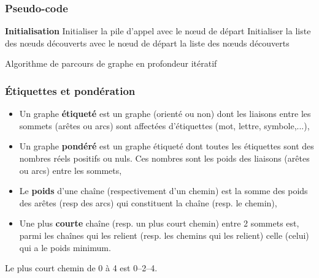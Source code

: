 \begin{frame}[fragile]
\frametitle{Pseudo-code}
\begin{algorithm}[H]
\SetAlgoLined
\textbf{Initialisation}\;
Initialiser la pile d'appel avec le n\oe{}ud de départ\;
Initialiser la liste des n\oe{}uds découverts avec le n\oe{}ud de départ\;
\Return la liste des n\oe{}uds découverts
\caption{Algorithme de parcours de graphe en profondeur itératif}
\end{algorithm}
\end{frame}

\begin{frame}[fragile]
\frametitle{Étiquettes et pondération}
\begin{itemize}
\item Un graphe \textbf{étiqueté} est un graphe (orienté ou non) dont les liaisons entre les sommets (arêtes ou arcs) sont affectées d’étiquettes (mot, lettre, symbole,...),
\item Un graphe \textbf{pondéré} est un graphe étiqueté dont toutes les étiquettes sont des nombres réels positifs ou nuls. Ces nombres sont les poids des liaisons (arêtes ou arcs) entre les sommets,
\item Le \textbf{poids} d’une chaîne (respectivement d’un chemin) est la somme des poids des arêtes (resp des arcs) qui constituent la chaîne (resp. le chemin),
\item Une plus \textbf{courte} chaîne (resp. un plus court chemin) entre 2 sommets est, parmi les chaînes qui les relient (resp. les chemins qui les relient) celle (celui) qui a le poids minimum.
\end{itemize}

\begin{minipage}{0.3\linewidth}
\begin{center}
\end{center}
\end{minipage}\hfill
\begin{minipage}{0.6\linewidth}
Le plus court chemin de 0 à 4 est 0--2--4.
\end{minipage}
\end{frame}


